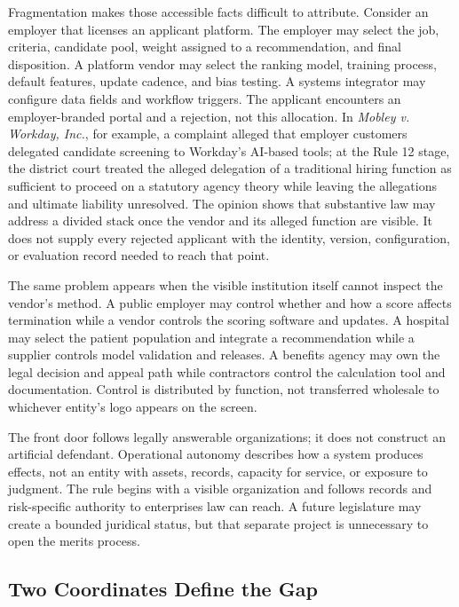 Fragmentation makes those accessible facts difficult to attribute. Consider an employer that licenses an applicant platform. The employer may select the job, criteria, candidate pool, weight assigned to a recommendation, and final disposition. A platform vendor may select the ranking model, training process, default features, update cadence, and bias testing. A systems integrator may configure data fields and workflow triggers. The applicant encounters an employer-branded portal and a rejection, not this allocation. In \emph{Mobley v. Workday, Inc.}, for example, a complaint alleged that employer customers delegated candidate screening to Workday's AI-based tools; at the Rule 12 stage, the district court treated the alleged delegation of a traditional hiring function as sufficient to proceed on a statutory agency theory while leaving the allegations and ultimate liability unresolved. The opinion shows that substantive law may address a divided stack once the vendor and its alleged function are visible. It does not supply every rejected applicant with the identity, version, configuration, or evaluation record needed to reach that point.

The same problem appears when the visible institution itself cannot inspect the vendor's method. A public employer may control whether and how a score affects termination while a vendor controls the scoring software and updates. A hospital may select the patient population and integrate a recommendation while a supplier controls model validation and releases. A benefits agency may own the legal decision and appeal path while contractors control the calculation tool and documentation. Control is distributed by function, not transferred wholesale to whichever entity's logo appears on the screen.

The front door follows legally answerable organizations; it does not construct an artificial defendant. Operational autonomy describes how a system produces effects, not an entity with assets, records, capacity for service, or exposure to judgment. The rule begins with a visible organization and follows records and risk-specific authority to enterprises law can reach. A future legislature may create a bounded juridical status, but that separate project is unnecessary to open the merits process.

\subsection{Two Coordinates Define the Gap}

